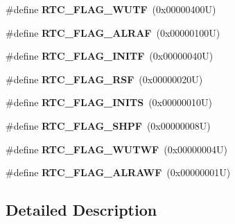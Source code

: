 \begin{DoxyCompactItemize}
\#define {\bfseries R\+T\+C\+\_\+\+F\+L\+A\+G\+\_\+\+W\+U\+TF}~(0x00000400\+U)
\item 
\mbox{\label{group___r_t_c___flags___definitions_gaf9e1a4b5eedd674d7b35ae334877ba12}} 
\#define {\bfseries R\+T\+C\+\_\+\+F\+L\+A\+G\+\_\+\+A\+L\+R\+AF}~(0x00000100\+U)
\item 
\mbox{\label{group___r_t_c___flags___definitions_ga8d973d7f6b07e80743e05d6822ff2147}} 
\#define {\bfseries R\+T\+C\+\_\+\+F\+L\+A\+G\+\_\+\+I\+N\+I\+TF}~(0x00000040\+U)
\item 
\mbox{\label{group___r_t_c___flags___definitions_ga78c4245996bef8d5f39226b6e37ed9c0}} 
\#define {\bfseries R\+T\+C\+\_\+\+F\+L\+A\+G\+\_\+\+R\+SF}~(0x00000020\+U)
\item 
\mbox{\label{group___r_t_c___flags___definitions_gae6a2d26d4b10670f6506b14971f52fd2}} 
\#define {\bfseries R\+T\+C\+\_\+\+F\+L\+A\+G\+\_\+\+I\+N\+I\+TS}~(0x00000010\+U)
\item 
\mbox{\label{group___r_t_c___flags___definitions_ga8fd11878d6285ab5d35966d598d5e6f9}} 
\#define {\bfseries R\+T\+C\+\_\+\+F\+L\+A\+G\+\_\+\+S\+H\+PF}~(0x00000008\+U)
\item 
\mbox{\label{group___r_t_c___flags___definitions_ga24648116b32442d30da74c497e2e88ae}} 
\#define {\bfseries R\+T\+C\+\_\+\+F\+L\+A\+G\+\_\+\+W\+U\+T\+WF}~(0x00000004\+U)
\item 
\mbox{\label{group___r_t_c___flags___definitions_gaf4913efa96d03ded991b1cdddd6b7823}} 
\#define {\bfseries R\+T\+C\+\_\+\+F\+L\+A\+G\+\_\+\+A\+L\+R\+A\+WF}~(0x00000001\+U)
\end{DoxyCompactItemize}


\subsection{Detailed Description}
